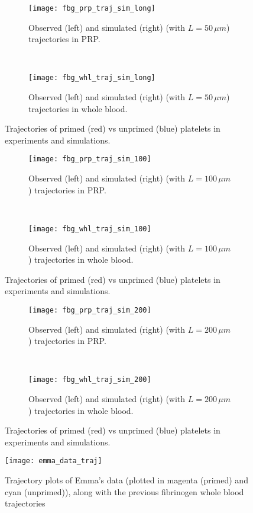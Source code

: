 \documentclass{article}
\begin{document}
\begin{figure}
  \centering
  \begin{subfigure}{\textwidth}
    \texttt{[image: fbg\_prp\_traj\_sim\_long]}
    \caption{Observed (left) and simulated (right) (with $L=50 \, \mu m$)
      trajectories in PRP.}
  \end{subfigure}
  \\
  \begin{subfigure}{\textwidth}
    \texttt{[image: fbg\_whl\_traj\_sim\_long]}
    \caption{Observed (left) and simulated (right) (with $L=50 \, \mu m$)
      trajectories in whole blood.}
  \end{subfigure}
  \caption{Trajectories of primed (red) vs unprimed (blue) platelets
    in experiments and simulations.}
  \label{fig:traj-plots-long}
\end{figure}

\begin{figure}
  \centering
  \begin{subfigure}{\textwidth}
    \texttt{[image: fbg\_prp\_traj\_sim\_100]}
    \caption{Observed (left) and simulated (right) (with $L=100 \, \mu m$)
      trajectories in PRP.}
  \end{subfigure}
  \\
  \begin{subfigure}{\textwidth}
    \texttt{[image: fbg\_whl\_traj\_sim\_100]}
    \caption{Observed (left) and simulated (right) (with $L=100 \, \mu m$)
      trajectories in whole blood.}
  \end{subfigure}
  \caption{Trajectories of primed (red) vs unprimed (blue) platelets
    in experiments and simulations.}
  \label{fig:traj-plots-100}
\end{figure}

\begin{figure}
  \centering
  \begin{subfigure}{\textwidth}
    \texttt{[image: fbg\_prp\_traj\_sim\_200]}
    \caption{Observed (left) and simulated (right) (with $L=200 \, \mu m$)
      trajectories in PRP.}
  \end{subfigure}
  \\
  \begin{subfigure}{\textwidth}
    \texttt{[image: fbg\_whl\_traj\_sim\_200]}
    \caption{Observed (left) and simulated (right) (with $L=200 \, \mu m$)
      trajectories in whole blood.}
  \end{subfigure}
  \caption{Trajectories of primed (red) vs unprimed (blue) platelets
    in experiments and simulations.}
  \label{fig:traj-plots-200}
\end{figure}

\begin{figure}
  \centering
  \texttt{[image: emma\_data\_traj]}
  \caption{Trajectory plots of Emma's data (plotted in magenta
    (primed) and cyan (unprimed)), along with the previous
    fibrinogen whole blood trajectories}
  \label{fig:emma-data}
\end{figure}
% 
% 
\end{document}
